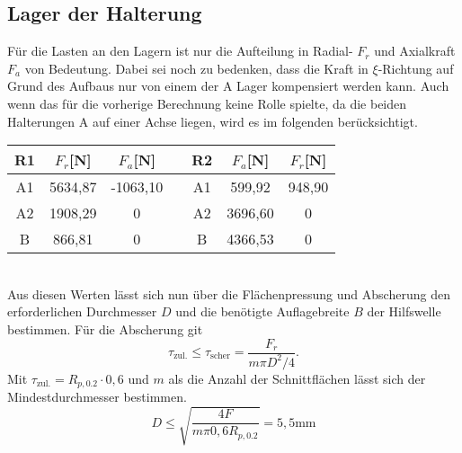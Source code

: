 \subsection{Lager der Halterung}
Für die Lasten an den Lagern ist nur die Aufteilung in Radial- $F_r$ und Axialkraft $F_a$ von Bedeutung. Dabei sei noch zu bedenken, dass die Kraft in $\xi$-Richtung auf Grund des Aufbaus nur von einem der A Lager kompensiert werden kann. Auch wenn das für die vorherige Berechnung keine Rolle spielte, da die beiden Halterungen A auf einer Achse liegen, wird es im folgenden berücksichtigt.
\begin{table}[h] 
	\centering 
	\begin{tabular}{c|c|cc||c|c|c} 
		\textbf{R1}&$F_{r}$[N]&$F_a$[N]&&\textbf{R2}&$F_{a}$[N]&$F_r$[N]\\ 
		\hline 
		A1& 5634,87&-1063,10&&A1&599,92&948,90\\
		A2&1908,29&0&&A2&3696,60&0\\
		B&866,81&0&&B&4366,53&0\\
	\end{tabular}
\end{table} \\
Aus diesen Werten lässt sich nun über die Flächenpressung und Abscherung den erforderlichen Durchmesser $D$ und die benötigte Auflagebreite $B$ der Hilfswelle bestimmen. Für die Abscherung git
\begin{equation}
	\tau_{\mathrm{zul.}}\leq\tau_\mathrm{scher}=\frac{F_r}{m\pi D^2/4}.
\end{equation}
Mit $\tau_{\mathrm{zul.}}=R_{p, 0.2}\cdot 0,6$ \cite{metall} und $m$ als die Anzahl der Schnittflächen lässt sich der Mindestdurchmesser bestimmen.
\begin{equation}
	D \leq \sqrt{\frac{4F}{m\pi 0,6 R_{p, 0.2}}}= 5,5\mathrm{mm}
\end{equation}
